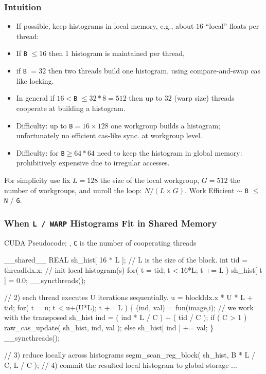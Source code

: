 \documentclass{beamer}
\renewcommand{\emph}[1]{\textcolor{structure}{#1}}
\newcommand{\emp}[1]{\textcolor{DikuRed}{ #1}}
\begin{document}
\begin{frame}[fragile,t]
  \frametitle{Intuition}
  
\begin{itemize}
    \item If possible, keep histograms in local memory, 
            e.g., about $16$ ``local'' floats per thread:\bigskip
    \item If {\tt B} $\leq 16$ then $1$ histogram is maintained per thread,
    \item if {\tt B} $= 32$ then two threads build one histogram,
            using compare-and-swap {\sc cas} like locking.\bigskip
    \item In general if $16 <${\tt B} $\leq 32*8 = 512$ then up to $32$ (warp size)
            threads cooperate at building a histogram.\bigskip
    \item \emp{Difficulty:} up to {\tt B}$=16\times128$ one workgroup 
            builds a histogram; unfortunately no efficient 
            {\sc cas}-like sync. at workgroup level.\bigskip
    \item \emp{Difficulty:} for {\tt B}$\geq 64*64$ need to keep the 
            histogram in global memory: prohibitively expensive
            due to irregular accesses.
\end{itemize}   


For simplicity use fix $L = 128$ the size of the local workgroup,
$G = 512$ the number of workgroups, and unroll the loop: $N / (L\times G)$.
Work Efficient $\sim$ {\tt B} $ \leq $ {\tt N} / {\tt G}.
  
\end{frame}


\begin{frame}[fragile,t]
  \frametitle{ When {\tt L / WARP} Histograms Fit in Shared Memory }

\begin{block}{ CUDA Pseudocode; {\tt }, {\tt C} is the number of cooperating threads}
\begin{colorcode}[fontsize=\scriptsize]
\emph{__shared__ REAL sh_hist[ 16 * L ];} // L is the size of the block.
int tid = threadIdx.x;
// \emp{init local histogram(s)}
for( t = tid; t < 16*L; t += L )
    sh_hist[ t ] = 0.0;  
__syncthreads();

// \emp{2) each thread executes U iterations sequentially.}
u = blockIdx.x * U * L + tid; 
for( t = u; t < u+(U*L); t += L ) \{
    (ind, val) = fun(image,i);
    // we work with the transposed sh_hist
    ind = ( ind * L / C ) + ( tid / C );  
    if ( C > 1 )
         \emph{raw_cas_update( sh_hist, ind, val );}
    else \emph{sh_hist[ ind ] += val;}
\}  __syncthreads();

// \emp{3) reduce locally across histograms}
segm_scan_reg_block( sh_hist, B * L / C, L / C );
// \emp{4) commit the resulted local histogram to global storage } ...
\end{colorcode}
\end{block} 
\end{frame}
\end{document}
